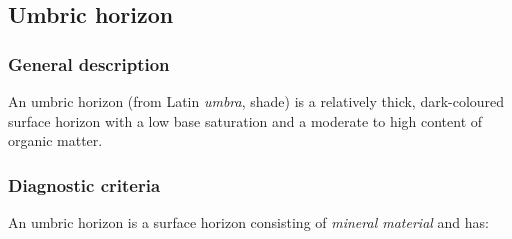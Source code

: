 \documentclass[
  letterpaper,
  DIV=11,
  numbers=noendperiod]{scrreprt}
\begin{document}
\hypertarget{umbric-horizon}{%
\subsection{Umbric horizon}\label{umbric-horizon}}

\hypertarget{general-description-38}{%
\subsubsection{General description}\label{general-description-38}}

An umbric horizon (from Latin \emph{umbra}, shade) is a relatively
thick, dark-coloured surface horizon with a low base saturation and a
moderate to high content of organic matter.

\hypertarget{diagnostic-criteria-38}{%
\subsubsection{Diagnostic criteria}\label{diagnostic-criteria-38}}

An umbric horizon is a surface horizon consisting of \emph{mineral
material} and has:
\end{document}
